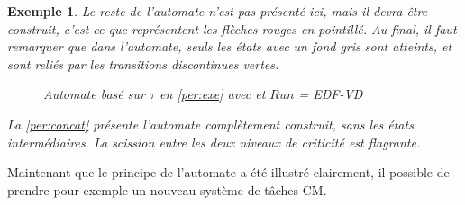 \documentclass[12pt,a4paper,oneside]{book}
\theoremstyle{break}
\newtheorem{exem}{Exemple}[chapter]
\theoremstyle{breakplain}
\begin{document}
\begin{exem}
Le reste de l'automate n'est pas présenté ici, mais il devra être construit, c'est ce que représentent les flèches rouges en pointillé. Au final, il faut remarquer que dans l'automate, seuls les états avec un fond gris sont atteints, et sont reliés par les transitions discontinues vertes.

\begin{figure}[h]
    \centering
    
    \resizebox{\textwidth}{!}{
    \fontsize{28pt}{12pt}\selectfont
    
    }
\caption{Automate basé sur $\tau$ en \autoref{per:exe} avec et $Run$ = \textit{EDF-VD}}
\label{per:concat}
\end{figure}
La \autoref{per:concat} présente l'automate complètement construit, sans les états intermédiaires. La scission entre les deux niveaux de criticité est flagrante.
\end{exem}

Maintenant que le principe de l'automate a été illustré clairement, il possible de prendre pour exemple un nouveau système de tâches CM.\\

\pagebreak
\end{document}
